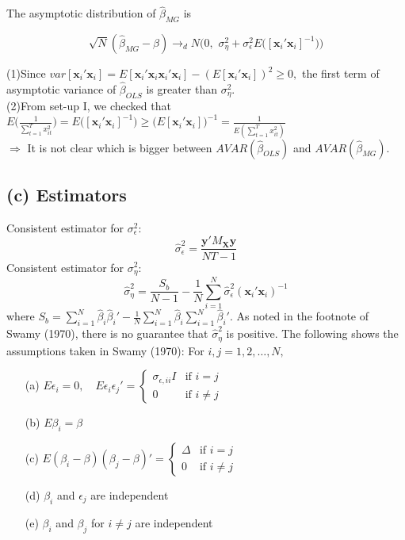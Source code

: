 The asymptotic distribution of $\widehat{\beta}_{MG}$ is

\[
\sqrt{N} (\widehat{\beta}_{MG}-\beta) \rightarrow_{d} N\bigg(0,\,\,\sigma_\eta^2+ \sigma_\epsilon^2 E\big([\mathbf{x}_i'  \mathbf{x}_i]^{-1} \big)\bigg)
\]


\vspace{0.2in}
(1)\quad Since $var[\mathbf{x}_i' \mathbf{x}_i] = E[\mathbf{x}_i'  \mathbf{x}_i\mathbf{x}_i' \mathbf{x}_i] - (E[\mathbf{x}_i'  \mathbf{x}_i])^2 \geq 0,$ the first term of asymptotic variance of $\widehat{\beta}_{OLS}$ is greater than $\sigma_\eta^2$.\\
(2)\quad From set-up I, we checked that $ E\bigg(\frac{1}{\sum_{t=1}^T x_{it}^2}\bigg) =  E\big([\mathbf{x}_i'  \mathbf{x}_i]^{-1}) \geq  \big(E[\mathbf{x}_i' \mathbf{x}_i]\big)^{-1}   =\frac{1}{E(\sum_{t=1}^T x_{it}^2)}$\\

$\Rightarrow$ It is not clear which is bigger between $AVAR(\widehat{\beta}_{OLS})$ and $AVAR(\widehat{\beta}_{MG})$.

\subsection*{(c) Estimators}
\vspace{0.2in}
Consistent estimator for $\sigma_\epsilon^2$:
\[
\widehat{\sigma}_\epsilon^2 = \frac{\mathbf{y}'M_{\mathbf{X}}\mathbf{y}}{NT-1}
\]
 Consistent estimator for $\sigma_\eta^2$:
\[
\widehat{\sigma}_\eta^2 = \frac{S_b}{N-1} - \frac{1}{N} \sum_{i=1}^N \widehat{\sigma}_\epsilon^2 (\mathbf{x}_i' \mathbf{x}_i)^{-1}
\]
where $S_b = \sum_{i=1}^N \widehat{\beta}_i \widehat{\beta}_i' - \frac{1}{N} \sum_{i=1}^N \widehat{\beta}_i \sum_{i=1}^N \widehat{\beta}_i'$. As noted in the footnote of Swamy (1970), there is no guarantee that $\widehat{\sigma}_\eta^2$ is positive. The following shows the assumptions taken in Swamy (1970): For $i,j = 1, 2, \ldots, N,$

\begin{itemize}
\item[(a)] $E\epsilon_i = 0, \quad E\epsilon_i\epsilon_j' = \begin{cases}
\sigma_{\epsilon,ii}I & \text{if $i=j$}\\
0& \text{if $i\neq j$}
\end{cases}
$
\item[(b)] $E\beta_i = \beta$
\item[(c)] $E(\beta_i - \beta)(\beta_j-\beta)' = \begin{cases}
\Delta & \text{if $i=j$}\\
0 & \text{if $i\neq j$}
\end{cases}$
\item[(d)] $\beta_i$ and $\epsilon_j$ are independent
\item[(e)] $\beta_i$ and $\beta_j$ for $i\neq j$ are independent
\end{itemize}
\vspace{0.2in}


